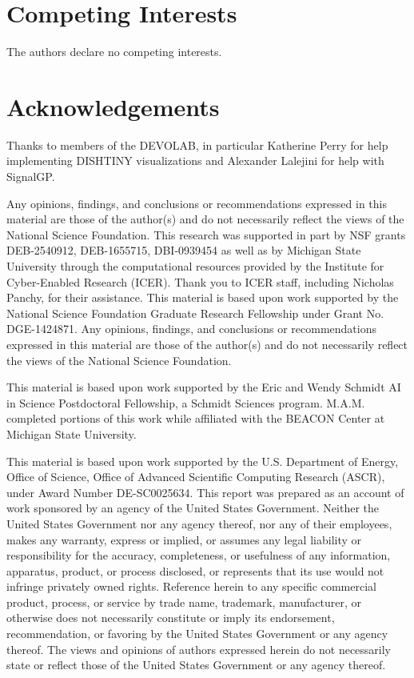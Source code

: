 \section*{Competing Interests}

The authors declare no competing interests.

\section*{Acknowledgements}

Thanks to members of the DEVOLAB, in particular Katherine Perry for help implementing DISHTINY visualizations and Alexander Lalejini for help with SignalGP.

Any opinions, findings, and conclusions or recommendations expressed in this material are those of the author(s) and do not necessarily reflect the views of the National Science Foundation.
This research was supported in part by NSF grants DEB-2540912, DEB-1655715, DBI-0939454 as well as by Michigan State University through the computational resources provided by the Institute for Cyber-Enabled Research (ICER).
Thank you to ICER staff, including Nicholas Panchy, for their assistance.
This material is based upon work supported by the National Science Foundation Graduate Research Fellowship under Grant No. DGE-1424871.
Any opinions, findings, and conclusions or recommendations expressed in this material are those of the author(s) and do not necessarily reflect the views of the National Science Foundation.

This material is based upon work supported by the Eric and Wendy Schmidt AI in Science Postdoctoral Fellowship, a Schmidt Sciences program.
M.A.M. completed portions of this work while affiliated with the BEACON Center at Michigan State University.

This material is based upon work supported by the U.S. Department of Energy, Office of Science, Office of Advanced Scientific Computing Research (ASCR), under Award Number DE-SC0025634.
This report was prepared as an account of work sponsored by an agency of the United States Government.
Neither the United States Government nor any agency thereof, nor any of their employees, makes any warranty, express or implied, or assumes any legal liability or responsibility for the accuracy, completeness, or usefulness of any information, apparatus, product, or process disclosed, or represents that its use would not infringe privately owned rights.
Reference herein to any specific commercial product, process, or service by trade name, trademark, manufacturer, or otherwise does not necessarily constitute or imply its endorsement, recommendation, or favoring by the United States Government or any agency thereof.
The views and opinions of authors expressed herein do not necessarily state or reflect those of the United States Government or any agency thereof.
